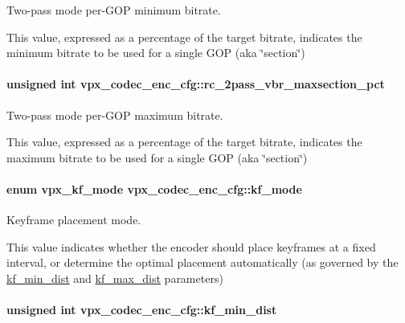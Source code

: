\-Two-\/pass mode per-\/\-G\-O\-P minimum bitrate. 

\-This value, expressed as a percentage of the target bitrate, indicates the minimum bitrate to be used for a single \-G\-O\-P (aka \char`\"{}section\char`\"{}) \hypertarget{structvpx__codec__enc__cfg_ab5212050b71b2d9f4dc663caa496949e}{
\paragraph[{rc\-\_\-2pass\-\_\-vbr\-\_\-maxsection\-\_\-pct}]{\setlength{\rightskip}{0pt plus 5cm}unsigned int {\bf vpx\-\_\-codec\-\_\-enc\-\_\-cfg\-::rc\-\_\-2pass\-\_\-vbr\-\_\-maxsection\-\_\-pct}}}\label{structvpx__codec__enc__cfg_ab5212050b71b2d9f4dc663caa496949e}


\-Two-\/pass mode per-\/\-G\-O\-P maximum bitrate. 

\-This value, expressed as a percentage of the target bitrate, indicates the maximum bitrate to be used for a single \-G\-O\-P (aka \char`\"{}section\char`\"{}) \hypertarget{structvpx__codec__enc__cfg_a491d67f061dcdb13f60c017563e9d788}{
\paragraph[{kf\-\_\-mode}]{\setlength{\rightskip}{0pt plus 5cm}enum {\bf vpx\-\_\-kf\-\_\-mode} {\bf vpx\-\_\-codec\-\_\-enc\-\_\-cfg\-::kf\-\_\-mode}}}\label{structvpx__codec__enc__cfg_a491d67f061dcdb13f60c017563e9d788}


\-Keyframe placement mode. 

\-This value indicates whether the encoder should place keyframes at a fixed interval, or determine the optimal placement automatically (as governed by the \hyperlink{structvpx__codec__enc__cfg_a0a7b5444ecb09745cbe8d5af17553846}{kf\-\_\-min\-\_\-dist} and \hyperlink{structvpx__codec__enc__cfg_ae018440136e271743376730413d25a9b}{kf\-\_\-max\-\_\-dist} parameters) \hypertarget{structvpx__codec__enc__cfg_a0a7b5444ecb09745cbe8d5af17553846}{
\paragraph[{kf\-\_\-min\-\_\-dist}]{\setlength{\rightskip}{0pt plus 5cm}unsigned int {\bf vpx\-\_\-codec\-\_\-enc\-\_\-cfg\-::kf\-\_\-min\-\_\-dist}}}\label{structvpx__codec__enc__cfg_a0a7b5444ecb09745cbe8d5af17553846}


